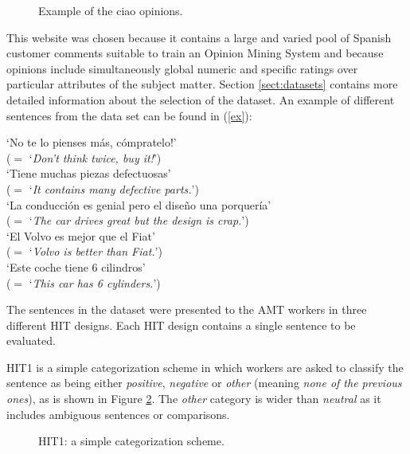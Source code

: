 \documentclass[11pt]{elsarticle}
\begin{document}
\begin{figure}[ht]
  \begin{center}
\caption{Example of the ciao opinions.}
\label{ciao}
  \end{center}
\end{figure}

This website was chosen because it contains a large and varied pool of Spanish customer comments suitable to train an Opinion Mining System and because opinions include simultaneously global numeric and specific ratings over particular attributes of the subject matter. Section \ref{sect:datasets} contains more detailed information about the selection of the dataset. An example of different sentences from the data set can be found in (\ref{ex}):

\begin{li}
  \label{ex}
  `No te lo pienses m\'{a}s, c\'{o}mpratelo!'\\
  ($=$ `\textit{Don't think twice, buy it!}')\\
   `Tiene muchas piezas defectuosas'\\
  ($=$ `\textit{It contains many defective parts.}')\\
   `La conducci\'on es genial pero el dise\~no una porquer\'ia'\\
  ($=$ `\textit{The car drives great but the design is crap.}')\\
   `El Volvo es mejor que el Fiat'\\
  ($=$ `\textit{Volvo is better than Fiat.}')\\
 `Este coche tiene 6 cilindros'\\
  ($=$ `\textit{This car has 6 cylinders.}')\\
\end{li}

The sentences in the dataset were presented to the AMT workers in three different HIT designs. Each HIT design contains a single sentence to be evaluated.

HIT1 is a simple categorization scheme in which workers are asked to classify the sentence as being either \textit{positive}, \textit{negative} or \textit{other} (meaning \textit{none of the previous ones}), as is shown in Figure \ref{hit1}. The \textit{other} category is wider than
\textit{neutral} as it includes ambiguous sentences or comparisons.

\begin{figure}[ht]
  \begin{center}
\caption{HIT1: a simple categorization scheme.}
\label{hit1}
  \end{center}
\end{figure}
\end{document}
